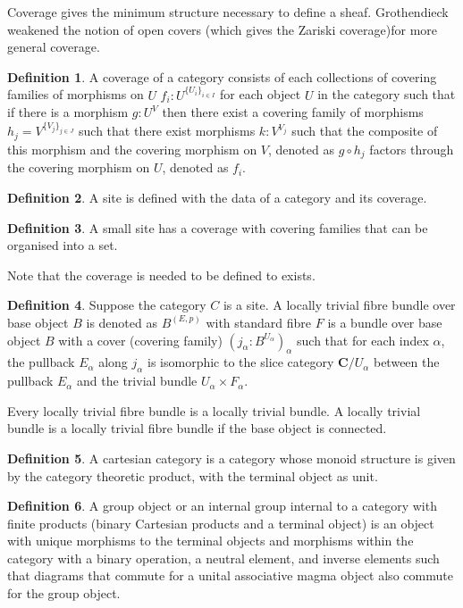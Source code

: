 \documentclass[10pt]{article}
\theoremstyle{plain}%
\theoremstyle{definition}
\newtheorem{definition}{Definition}[section]
\theoremstyle{remark}
\begin{document}
Coverage gives the minimum structure necessary to define a sheaf. Grothendieck weakened the notion of open covers (which gives the Zariski coverage)for more general coverage.

\begin{definition}
	A coverage of a category consists of each collections of covering families of morphisms on $U$ $f_i : U^{\{U_i\}_{i \in I}}$ for each object $U$ in the category such that if there is a morphism $g : U^V$ then there exist a covering family of morphisms $h_j = V^{\{V_j\}_{j \in J}}$
	such that there exist morphisms $k : V^{V_j}$ such that the composite of this morphism and the covering morphism on $V$, denoted as $g \circ h_j$ factors through the covering morphism on $U$, denoted as $f_i$.
\end{definition}

\begin{definition}
	A site is defined with the data of a category and its coverage.
\end{definition}

\begin{definition}
	A small site has a coverage with covering families that can be organised into a set.
\end{definition}

Note that the coverage is needed to be defined to exists.

\begin{definition}
	Suppose the category $C$ is a site.
	A locally trivial fibre bundle over base object $B$ is denoted as $B^{(E, p)}$ with standard fibre $F$ is a bundle over base object $B$ with a cover (covering family) $(j_\alpha : B^{U_\alpha})_\alpha$ such that for each index $\alpha$, the pullback $E_\alpha$ along $j_\alpha$ is isomorphic to the slice category $\mathbf{C} / U_\alpha$ between the pullback $E_\alpha$ and the trivial bundle $U_\alpha \times F_\alpha$.
\end{definition}

Every locally trivial fibre bundle is a locally trivial bundle. A locally trivial bundle is a locally trivial fibre bundle if the base object is connected.

\begin{definition}
	A cartesian category is a category whose monoid structure is given by the category theoretic product, with the terminal object as unit.
\end{definition}

\begin{definition}
	A group object or an internal group internal to a category with finite products (binary Cartesian products and a terminal object) is an object with unique morphisms to the terminal objects and morphisms within the category with a binary operation, a neutral element, and inverse elements such that diagrams that commute for a unital associative magma object also commute for the group object.
\end{definition}
\end{document}
